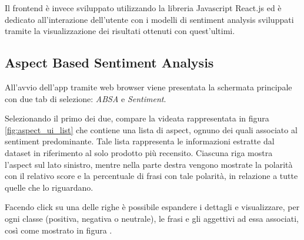 \documentclass[hidelinks, 12pt]{article}
\begin{document}
Il frontend è invece sviluppato utilizzando la libreria Javascript React.js \cite{site:react} ed è dedicato all'interazione dell'utente con i modelli di sentiment analysis sviluppati tramite la visualizzazione dei risultati ottenuti con quest'ultimi.



\subsection{Aspect Based Sentiment Analysis}
\label{sec:ui_abas}

All'avvio dell'app tramite web browser viene presentata la schermata principale con due tab di selezione: {\it ABSA} e {\it Sentiment}.

Selezionando il primo dei due, compare la videata rappresentata in figura \ref{fig:aspect_ui_list}  che contiene una lista di aspect, ognuno dei quali associato al sentiment predominante. Tale lista rappresenta le informazioni estratte dal dataset in riferimento al solo prodotto più recensito. Ciascuna riga mostra l'aspect sul lato sinistro, mentre nella parte destra vengono mostrate la polarità con il relativo score e la percentuale di frasi con tale polarità, in relazione a tutte quelle che lo riguardano. 

Facendo click su una delle righe è possibile espandere i dettagli e visualizzare, per ogni classe (positiva, negativa o neutrale), le frasi e gli aggettivi ad essa associati, così come mostrato in figura .
\end{document}
